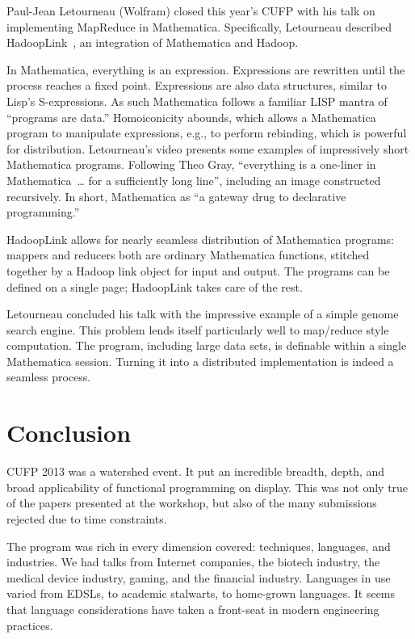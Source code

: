 \documentclass{jfp1}
\begin{document}

Paul-Jean Letourneau (Wolfram) closed this year's CUFP with his talk on
implementing MapReduce in Mathematica. Specifically, Letourneau described
HadoopLink~\cite{Letourneau:2013:HadoopLink}, an integration of Mathematica
and Hadoop.

In Mathematica, everything is an expression. Expressions are rewritten
until the process reaches a fixed point. Expressions are also data
structures, similar to Lisp's S-expressions.  As such Mathematica follows a
familiar LISP mantra of ``programs are data.'' Homoiconicity abounds, which
allows a Mathematica program to manipulate expressions, e.g., to perform
rebinding, which is powerful for distribution.  Letourneau's video presents
some examples of impressively short Mathematica programs. Following Theo
Gray, ``everything is a one-liner in Mathematica~\ldots{} for a
sufficiently long line'', including an image constructed recursively.  In
short, Mathematica as ``a gateway drug to declarative programming.''

HadoopLink allows for nearly seamless distribution of Mathematica programs:
mappers and reducers both are ordinary Mathematica functions, stitched
together by a Hadoop link object for input and output. The programs can be
defined on a single page; HadoopLink takes care of the rest.

Letourneau concluded his talk with the impressive example of a simple
genome search engine. This problem lends itself particularly well to
map/reduce style computation. The program, including large data sets, is
definable within a single Mathematica session. Turning it into a
distributed implementation is indeed a seamless process.

\section{Conclusion}

CUFP 2013 was a watershed event. It put an incredible breadth, depth, and
broad applicability of functional programming on display. This was not only
true of the papers presented at the workshop, but also of the many
submissions rejected due to time constraints.

The program was rich in every dimension covered: techniques, languages, and
industries. We had talks from Internet companies, the biotech industry, the
medical device industry, gaming, and the financial industry. Languages in
use varied from EDSLs, to academic stalwarts, to home-grown languages. It
seems that language considerations have taken a front-seat in modern
engineering practices.
\end{document}
